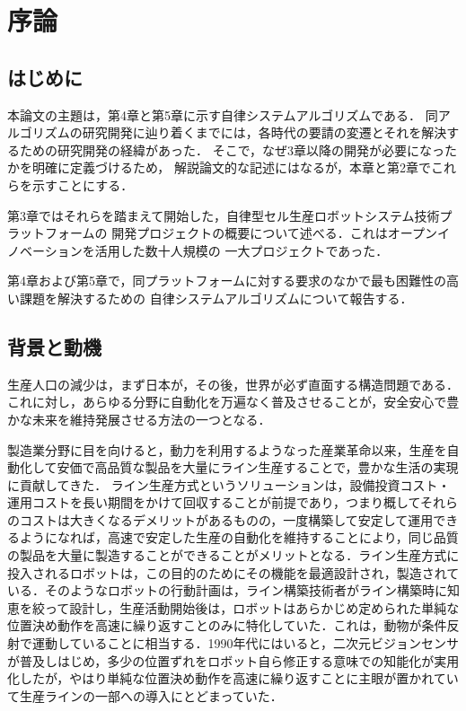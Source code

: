 

\section{序論}
\subsection{はじめに}

本論文の主題は，第4章と第5章に示す自律システムアルゴリズムである．
同アルゴリズムの研究開発に辿り着くまでには，各時代の要請の変遷とそれを解決するための研究開発の経緯があった．
そこで，なぜ3章以降の開発が必要になったかを明確に定義づけるため，
解説論文的な記述にはなるが，本章と第2章でこれらを示すことにする．

第3章ではそれらを踏まえて開始した，自律型セル生産ロボットシステム技術プラットフォームの
開発プロジェクトの概要について述べる．これはオープンイノベーションを活用した数十人規模の
一大プロジェクトであった．

第4章および第5章で，同プラットフォームに対する要求のなかで最も困難性の高い課題を解決するための
自律システムアルゴリズムについて報告する．




\subsection{背景と動機}

生産人口の減少は，まず日本が，その後，世界が必ず直面する構造問題である．これに対し，あらゆる分野に自動化を万遍なく普及させることが，安全安心で豊かな未来を維持発展させる方法の一つとなる．

製造業分野に目を向けると，動力を利用するようなった産業革命以来，生産を自動化して安価で高品質な製品を大量にライン生産することで，豊かな生活の実現に貢献してきた．
ライン生産方式というソリューションは，設備投資コスト・運用コストを長い期間をかけて回収することが前提であり，つまり概してそれらのコストは大きくなるデメリットがあるものの，一度構築して安定して運用できるようになれば，高速で安定した生産の自動化を維持することにより，同じ品質の製品を大量に製造することができることがメリットとなる．ライン生産方式に投入されるロボットは，この目的のためにその機能を最適設計され，製造されている．そのようなロボットの行動計画は，ライン構築技術者がライン構築時に知恵を絞って設計し，生産活動開始後は，ロボットはあらかじめ定められた単純な位置決め動作を高速に繰り返すことのみに特化していた．これは，動物が条件反射で運動していることに相当する．1990年代にはいると，二次元ビジョンセンサが普及しはじめ，多少の位置ずれをロボット自ら修正する意味での知能化が実用化したが，やはり単純な位置決め動作を高速に繰り返すことに主眼が置かれていて生産ラインの一部への導入にとどまっていた．

